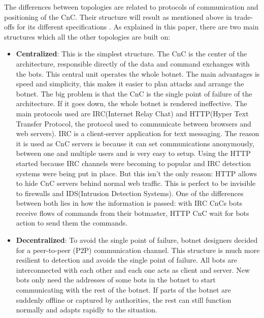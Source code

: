 The differences between topologies are related to protocols of communication and positioning of the CnC. Their structure will result as mentioned above in trade-offs for its different specifications \cite{survey6}.
As explained in this paper\cite{bot-intro}, there are two main structures which all the other topologies are built on:
\begin{itemize}[noitemsep]
\item \textbf{Centralized}: This is the simplest structure. The CnC is the center of the architecture, responsible directly of the data and command exchanges with the bots. This central unit operates the whole botnet. The main advantages is speed and simplicity, this makes it easier to plan attacks and arrange the botnet. The big problem is that the CnC is the single point of failure of the architecture. If it goes down, the whole botnet is rendered ineffective. The main protocols used are IRC(Internet Relay Chat) and HTTP(Hyper Text Transfer Protocol, the protocol used to communicate between browsers and web servers). IRC is a client-server application for text messaging. The reason it is used as CnC servers is because it can set communications anonymously, between one and multiple users and is very easy to setup. Using the HTTP started because IRC channels were becoming to popular and IRC detection systems were being put in place. But this isn't the only reason: HTTP allows to hide CnC servers behind normal web traffic. This is perfect to be invisible to firewalls and IDS(Intrusion Detection Systems). One of the differences between both lies in how the information is passed: with IRC CnCs bots receive flows of commands from their botmaster, HTTP CnC wait for bots action to send them the commands.\cite{bot-com}
\item \textbf{Decentralized}: To avoid the single point of failure, botnet designers decided for a peer-to-peer (P2P) communication channel. This structure is much more resilient to detection and avoids the single point of failure. All bots are interconnected with each other and each one acts as client and server. New bots only need the addresses of some bots in the botnet to start communicating with the rest of the botnet. If parts of the botnet are suddenly offline or captured by authorities, the rest can still function normally and adapts rapidly to the situation.\cite{ict-11}
\end{itemize}

